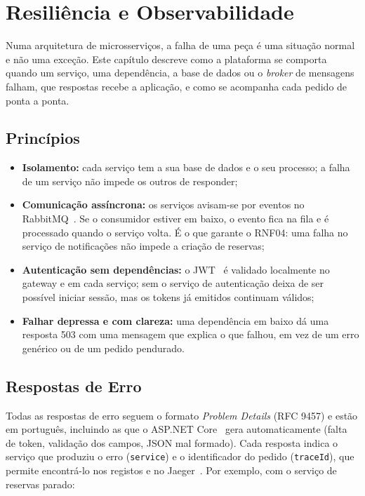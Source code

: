 \chapter{Resiliência e Observabilidade}
\label{cap:resiliencia}

Numa arquitetura de microsserviços, a falha de uma peça é uma situação normal e não uma
exceção. Este capítulo descreve como a plataforma se comporta quando um serviço, uma
dependência, a base de dados ou o \textit{broker} de mensagens falham, que respostas recebe a
aplicação, e como se acompanha cada pedido de ponta a ponta.

\section{Princípios}

\begin{itemize}
  \item \textbf{Isolamento:} cada serviço tem a sua base de dados e o seu processo; a falha de um
        serviço não impede os outros de responder;
  \item \textbf{Comunicação assíncrona:} os serviços avisam-se por eventos no RabbitMQ~\cite{rabbitmq}. Se o
        consumidor estiver em baixo, o evento fica na fila e é processado quando o serviço
        volta. É o que garante o RNF04: uma falha no serviço de notificações não impede a criação de reservas;
  \item \textbf{Autenticação sem dependências:} o JWT~\cite{rfc7519} é validado localmente no gateway e em cada
        serviço; sem o serviço de autenticação deixa de ser possível iniciar sessão, mas os
        tokens já emitidos continuam válidos;
  \item \textbf{Falhar depressa e com clareza:} uma dependência em baixo dá uma resposta 503 com uma
        mensagem que explica o que falhou, em vez de um erro genérico ou de um pedido pendurado.
\end{itemize}

\section{Respostas de Erro}

Todas as respostas de erro seguem o formato \textit{Problem Details} (RFC 9457) e estão em
português, incluindo as que o ASP.NET Core~\cite{dotnet,aspnetcore} gera automaticamente (falta de token, validação dos
campos, JSON mal formado). Cada resposta indica o serviço que produziu o erro (\texttt{service})
e o identificador do pedido (\texttt{traceId}), que permite encontrá-lo nos registos e no
Jaeger~\cite{jaeger}. Por exemplo, com o serviço de reservas parado:

